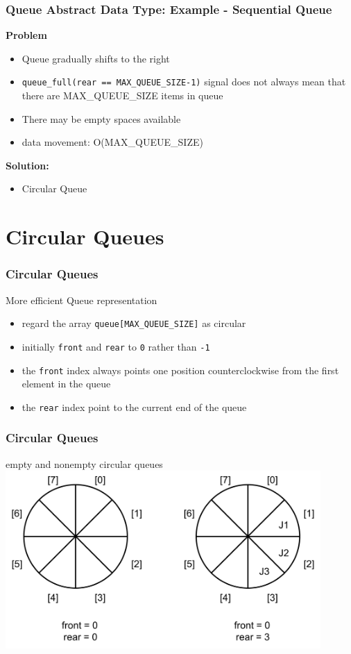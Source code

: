 \documentclass[newPxFont,sthlmFooter,nooffset]{beamer}
\begin{document}
\begin{frame}[t, fragile]
  \frametitle{Queue Abstract Data Type: Example - Sequential Queue}
\textbf{Problem}
\begin{itemize}
\item Queue gradually shifts to the right
\item \texttt{queue\_full(rear == MAX\_QUEUE\_SIZE-1)} signal does not
  always mean that there are MAX\_QUEUE\_SIZE items in queue
\item There may be empty spaces available
\item data movement: O(MAX\_QUEUE\_SIZE)
\end{itemize}
\bigskip
\textbf{Solution:}
  \begin{itemize}
  \item<2-> Circular Queue
  \end{itemize}
\end{frame}


\section{Circular Queues} 
\begin{frame}[t]
  \frametitle{Circular Queues}
More efficient Queue representation
\begin{itemize}
\item  regard the array \texttt{queue[MAX\_QUEUE\_SIZE]} as circular
\item initially \texttt{front} and \texttt{rear} to \texttt{0} rather than \texttt{-1}
\item the \texttt{front} index always points one position counterclockwise from the first element in the queue
\item the \texttt{rear} index point to the current end of the queue
\end{itemize}
\end{frame}

\begin{frame}[t]
  \frametitle{Circular Queues}
empty and nonempty circular queues
\includegraphics[width=0.9\textwidth]{figures/fig04_cq.png}
\end{frame}
\end{document}
